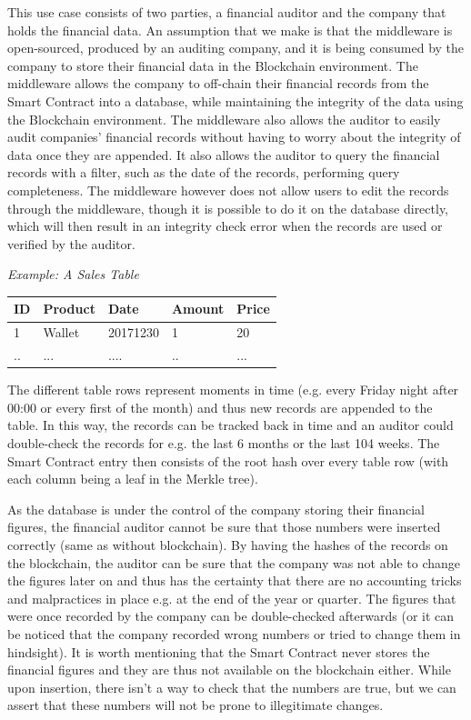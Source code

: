 This use case consists of two parties, a financial auditor and the company that holds the financial data. An assumption that we make is that the middleware is open-sourced, produced by an auditing company, and it is being consumed by the company to store their financial data in the Blockchain environment. The middleware allows the company to off-chain their financial records from the Smart Contract into a database, while maintaining the integrity of the data using the Blockchain environment. The middleware also allows the auditor to easily audit companies’ financial records without having to worry about the integrity of data once they are appended. It also allows the auditor to query the financial records with a filter, such as the date of the records, performing query completeness. The middleware however does not allow users to edit the records through the middleware, though it is possible to do it on the database directly, which will then result in an integrity check error when the records are used or verified by the auditor.

\textit{Example: A Sales Table}
\begin{center}
    \begin{tabular}{| l | l | l | l | l |}
    \hline
    ID & Product & Date & Amount & Price \\ \hline
    1 & Wallet & 20171230 & 1 & 20 \\ \hline
    .. & ... & .... & .. & ... \\ \hline
    \end{tabular}
\end{center}

The different table rows represent moments in time (e.g. every Friday night after 00:00 or every first of the month) and thus new records are appended to the table. In this way, the records can be tracked back in time and an auditor could double-check the records for e.g. the last 6 months or the last 104 weeks. The Smart Contract entry then consists of the root hash over every table row (with each column being a leaf in the Merkle tree).

As the database is under the control of the company storing their financial figures, the financial auditor cannot be sure that those numbers were inserted correctly (same as without blockchain). By having the hashes of the records on the blockchain, the auditor can be sure that the company was not able to change the figures later on and thus has the certainty that there are no accounting tricks and malpractices in place e.g. at the end of the year or quarter. The figures that were once recorded by the company can be double-checked afterwards (or it can be noticed that the company recorded wrong numbers or tried to change them in hindsight). It is worth mentioning that the Smart Contract never stores the financial figures and they are thus not available on the blockchain either. While upon insertion, there isn’t a way to check that the numbers are true, but we can assert that these numbers will not be prone to illegitimate changes.

